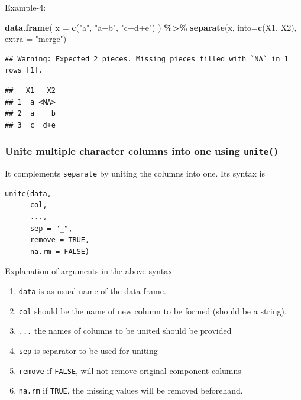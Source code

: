 \documentclass[
]{book}
\newenvironment{Shaded}{\begin{snugshade}}{\end{snugshade}}
\newcommand{\AttributeTok}[1]{\textcolor[rgb]{0.13,0.29,0.53}{#1}}
\newcommand{\FunctionTok}[1]{\textcolor[rgb]{0.13,0.29,0.53}{\textbf{#1}}}
\newcommand{\NormalTok}[1]{#1}
\newcommand{\SpecialCharTok}[1]{\textcolor[rgb]{0.81,0.36,0.00}{\textbf{#1}}}
\newcommand{\StringTok}[1]{\textcolor[rgb]{0.31,0.60,0.02}{#1}}
\providecommand{\tightlist}{%
  \setlength{\itemsep}{0pt}\setlength{\parskip}{0pt}}
\begin{document}
Example-4:

\begin{Shaded}
\begin{Highlighting}[]
\FunctionTok{data.frame}\NormalTok{(}
  \AttributeTok{x =} \FunctionTok{c}\NormalTok{(}\StringTok{"a"}\NormalTok{, }\StringTok{"a+b"}\NormalTok{, }\StringTok{"c+d+e"}\NormalTok{)}
\NormalTok{) }\SpecialCharTok{\%\textgreater{}\%} 
  \FunctionTok{separate}\NormalTok{(x,}
           \AttributeTok{into=}\FunctionTok{c}\NormalTok{(}\StringTok{\textquotesingle{}X1\textquotesingle{}}\NormalTok{, }\StringTok{\textquotesingle{}X2\textquotesingle{}}\NormalTok{),}
           \AttributeTok{extra =} \StringTok{"merge"}\NormalTok{)}
\end{Highlighting}
\end{Shaded}

\begin{verbatim}
## Warning: Expected 2 pieces. Missing pieces filled with `NA` in 1 rows [1].
\end{verbatim}

\begin{verbatim}
##   X1   X2
## 1  a <NA>
## 2  a    b
## 3  c  d+e
\end{verbatim}

\hypertarget{unite-multiple-character-columns-into-one-using-unite}{%
\subsubsection*{\texorpdfstring{Unite multiple character columns into one using \texttt{unite()}}{Unite multiple character columns into one using unite()}}\label{unite-multiple-character-columns-into-one-using-unite}}

It complements \texttt{separate} by uniting the columns into one. Its syntax is

\begin{verbatim}
unite(data, 
      col, 
      ..., 
      sep = "_", 
      remove = TRUE, 
      na.rm = FALSE)
\end{verbatim}

Explanation of arguments in the above syntax-

\begin{enumerate}
\def\labelenumi{\arabic{enumi}.}
\tightlist
\item
  \texttt{data} is as usual name of the data frame.
\item
  \texttt{col} should be the name of new column to be formed (should be a string),
\item
  \texttt{...} the names of columns to be united should be provided
\item
  \texttt{sep} is separator to be used for uniting
\item
  \texttt{remove} if \texttt{FALSE}, will not remove original component columns
\item
  \texttt{na.rm} if \texttt{TRUE}, the missing values will be removed beforehand.
\end{enumerate}
\end{document}
